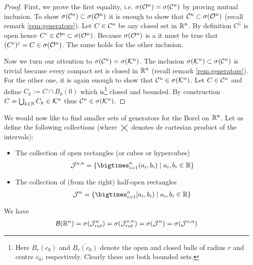 \begin{proof}
	First, we prove the first equality, i.e. $\sigma(\mathcal{O}^n) = \sigma(\mathcal{C}^n)$ by proving mutual inclusion. To show $\sigma(\mathcal{C}^n) \subset \sigma(\mathcal{O}^n)$ it is enough to show that $\mathcal{C}^n \subset \sigma(\mathcal{O}^n)$ (recall remark \ref{rem:generators}). Let $C \in \mathcal{C}^n$ be any closed set in $\mathbb{R}^n$. By definition $C^\complement$ is open hence $C^c \in \mathcal{O}^n \subset \sigma(\mathcal{O}^n)$. Because $\sigma(\mathcal{O}^n)$ is a \siga it must be true that $(C^c)^c = C \in \sigma(\mathcal{O}^n)$. The same holds for the other inclusion.
	
	Now we turn our attention to $\sigma(\mathcal{C}^n) = \sigma(\mathcal{K}^n)$. The inclusion $\sigma(\mathcal{K}^n) \subset \sigma (\mathcal{C}^n)$ is trivial because every compact set is closed in $\mathbb{R}^n$ (recall remark \ref{rem:generators}). For the other one, it is again enough to show that $\mathcal{C}^n \in \sigma(\mathcal{K}^n)$. Let $C \in \mathcal{C}^n$ and define $C_k := C \cap \overline{B_k(0)}$ which is\footnote{Here $B_r(c_0)$ and $\overline{B_r(c_0)}$ denote the open and closed balls of radius $r$ and centre $c_0$, respectively. Clearly these are both bounded sets.} closed and bounded. By construction $C = \bigcup_{k \in \mathbb{N}} C_k \in \mathcal{K}^n$ thus $\mathcal{C}^n \in \sigma(\mathcal{K}^n)$.
\end{proof}

We would now like to find smaller sets of generators for the Borel \siga on $\mathbb{R}^n$. Let us define the following collections (where $\bigtimes$ denotes de cartesian product of the intervals):

\newcommand{\calJ}{\mathcal{J}}
\begin{itemize}
	\item The collection of open rectangles (or cubes or hypercubes)
	\begin{align*}
		\calJ^{o,n} = \{\bigtimes_{i = 1}^n (a_i, b_i) \mid a_i, b_i \in \R\}
	\end{align*}
	\item The collection of (from the right) half-open rectangles
	\begin{align*}
		\calJ^{n} = \{\bigtimes_{i = 1}^n [a_i, b_i) \mid a_i, b_i \in \R\}
	\end{align*}
\end{itemize}

\begin{thm}
	We have
	\begin{align*}
		\borel(\R^n) = \sigma(\calJ_{rat}^n) = \sigma(\calJ_{rat}^{o,n}) = \sigma(\calJ^n) = \sigma(\calJ^{o,n})
	\end{align*}
\end{thm}

